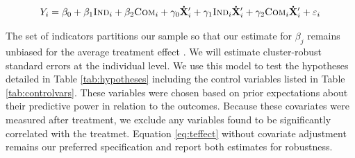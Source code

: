 \documentclass[11pt, a4paper]{article}\usepackage[]{graphicx}\usepackage[]{color}
\begin{document}
        \begin{equation} \label{eq:controls}
            Y_{i} = \beta_{0} + \beta_{1}\text{\textsc{Ind}}_{i} + \beta_{2}\text{\textsc{Com}}_{i} + \gamma_{0} \mathbf{\dot X}'_i + \gamma_{1}\text{\textsc{Ind}}_{i} \mathbf{\dot X}'_i + \gamma_{2}\text{\textsc{Com}}_{i} \mathbf{\dot X}'_i + \varepsilon_{i}
        \end{equation}

        The set of indicators partitions our sample so that our estimate for $\beta_j$ remains unbiased for the average treatment effect \parencite{lin_agnostic_2013}. We will estimate cluster-robust standard errors at the individual level. We use this model to test the hypotheses detailed in Table \ref{tab:hypotheses} including the control variables listed in Table \ref{tab:controlvars}. These variables were chosen based on prior expectations about their predictive power in relation to the outcomes. Because these covariates were measured after treatment, we exclude any variables found to be significantly correlated with the treatmet. Equation \ref{eq:teffect} without covariate adjustment remains our preferred specification and report both estimates for robustness.

        \begin{table}[h]
        \centering
        \caption{Control variables for covariate adjustment}
        \label{tab:controlvars}
        \end{table}
\end{document}
